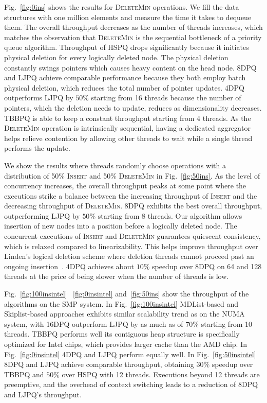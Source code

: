 \documentclass[10pt,journal,letter,compsoc]{IEEEtran}
\begin{document}
Fig.~\ref{fig:0ins} shows the results for \textsc{DeleteMin} operations.
We fill the data structures with one million elements and measure the time it takes to dequeue them.
The overall throughput decreases as the number of threads increases, which matches the observation that \textsc{DeleteMin} is the sequential bottleneck of a priority queue algorithm.
Throughput of HSPQ drops significantly because it initiates physical deletion for every logically deleted node.
The physical deletion constantly swings pointers which causes heavy content on the head node.
8DPQ and LJPQ achieve comparable performance because they both employ batch physical deletion, which reduces the total number of pointer updates.
4DPQ outperforms LJPQ by $50\%$ starting from 16 threads because the number of pointers, which the deletion needs to update, reduces as dimensionality decreases.
TBBPQ is able to keep a constant throughput starting from 4 threads.
As the \textsc{DeleteMin} operation is intrinsically sequential, having a dedicated aggregator helps relieve contention by allowing other threads to wait while a single thread performs the update.

We show the results where threads randomly choose operations with a distribution of 50\% \textsc{Insert} and 50\% \textsc{DeleteMin} in Fig.~\ref{fig:50ins}.
As the level of concurrency increases, the overall throughput peaks at some point where the executions strike a balance between the increasing throughput of \textsc{Insert} and the decreasing throughput of \textsc{DeleteMin}.
8DPQ exhibits the best overall throughput, outperforming LJPQ by $50\%$ starting from 8 threads.
Our algorithm allows insertion of new nodes into a position before a logically deleted node.
The concurrent executions of \textsc{Insert} and \textsc{DeleteMin} guarantees quiescent consistency, which is relaxed compared to linearizability.
This helps improve throughput over Linden's logical deletion scheme where deletion threads cannot proceed past an ongoing insertion~\cite{linden2013skiplist}.
4DPQ achieves about $10\%$ speedup over 8DPQ on 64 and 128 threads at the price of being slower when the number of threads is low. 

Fig.~\ref{fig:100insintel} ~\ref{fig:0insintel} and~\ref{fig:50ins} show the throughput of the algorithms on the SMP system.
In Fig.~\ref{fig:100insintel} MDList-based and Skiplist-based approaches exhibits similar scalability trend as on the NUMA system, with 16DPQ outperform LJPQ by as much as of $70\%$ starting from 10 threads.
TBBPQ performs well its contiguous heap structure is specifically optimized for Intel chips, which provides larger cache than the AMD chip.
In Fig.~\ref{fig:0insintel} 4DPQ and LJPQ perform equally well.
In Fig.~\ref{fig:50insintel} 8DPQ and LJPQ achieve comparable throughput, obtaining $30\%$ speedup over TBBPQ and $50\%$ over HSPQ with 12 threads.
Executions beyond 12 threads are preemptive, and the overhead of context switching leads to a reduction of 8DPQ and LJPQ's throughput.
\end{document}

